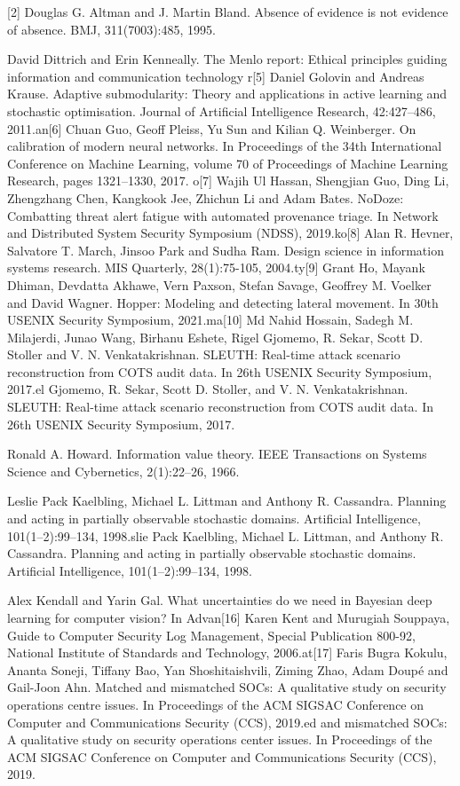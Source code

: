\documentclass[a4paper,11pt]{article}
\begin{document}
[2] Douglas G. Altman and J. Martin Bland. Absence of evidence is not evidence of absence. BMJ, 311(7003):485, 1995.\par
[3] David Dittrich and Erin Kenneally. The Menlo report: Ethical principles guiding information and communication technology r[5] Daniel Golovin and Andreas Krause. Adaptive submodularity: Theory and applications in active learning and stochastic optimisation. Journal of Artificial Intelligence Research, 42:427–486, 2011.an[6] Chuan Guo, Geoff Pleiss, Yu Sun and Kilian Q. Weinberger. On calibration of modern neural networks. In Proceedings of the 34th International Conference on Machine Learning, volume 70 of Proceedings of Machine Learning Research, pages 1321–1330, 2017. o[7] Wajih Ul Hassan, Shengjian Guo, Ding Li, Zhengzhang Chen, Kangkook Jee, Zhichun Li and Adam Bates. NoDoze: Combatting threat alert fatigue with automated provenance triage. In Network and Distributed System Security Symposium (NDSS), 2019.ko[8] Alan R. Hevner, Salvatore T. March, Jinsoo Park and Sudha Ram. Design science in information systems research. MIS Quarterly, 28(1):75-105, 2004.ty[9] Grant Ho, Mayank Dhiman, Devdatta Akhawe, Vern Paxson, Stefan Savage, Geoffrey M. Voelker and David Wagner. Hopper: Modeling and detecting lateral movement. In 30th USENIX Security Symposium, 2021.ma[10] Md Nahid Hossain, Sadegh M. Milajerdi, Junao Wang, Birhanu Eshete, Rigel Gjomemo, R. Sekar, Scott D. Stoller and V. N. Venkatakrishnan. SLEUTH: Real-time attack scenario reconstruction from COTS audit data. In 26th USENIX Security Symposium, 2017.el Gjomemo, R. Sekar, Scott D. Stoller, and V. N. Venkatakrishnan. SLEUTH: Real-time attack scenario reconstruction from COTS audit data. In 26th USENIX Security Symposium, 2017.\par
[11] Ronald A. Howard. Information value theory. IEEE Transactions on Systems Science and Cybernetics, 2(1):22–26, 1966.\par
[12][13] Leslie Pack Kaelbling, Michael L. Littman and Anthony R. Cassandra. Planning and acting in partially observable stochastic domains. Artificial Intelligence, 101(1–2):99–134, 1998.slie Pack Kaelbling, Michael L. Littman, and Anthony R. Cassandra. Planning and acting in partially observable stochastic domains. Artificial Intelligence, 101(1–2):99–134, 1998.\par
[14] Alex Kendall and Yarin Gal. What uncertainties do we need in Bayesian deep learning for computer vision? In Advan[16] Karen Kent and Murugiah Souppaya, Guide to Computer Security Log Management, Special Publication 800-92, National Institute of Standards and Technology, 2006.at[17] Faris Bugra Kokulu, Ananta Soneji, Tiffany Bao, Yan Shoshitaishvili, Ziming Zhao, Adam Doupé and Gail-Joon Ahn. Matched and mismatched SOCs: A qualitative study on security operations centre issues. In Proceedings of the ACM SIGSAC Conference on Computer and Communications Security (CCS), 2019.ed and mismatched SOCs: A qualitative study on security operations center issues. In Proceedings of the ACM SIGSAC Conference on Computer and Communications Security (CCS), 2019.\par
\end{document}
